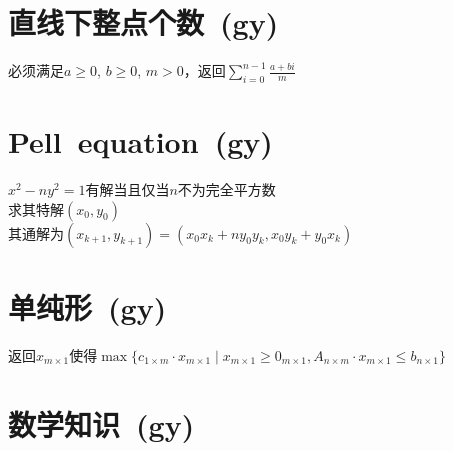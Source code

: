 \section{直线下整点个数\ \small(gy)}
    必须满足$ a \geq 0 $, $ b \geq 0 $, $ m > 0 $，返回$ \sum\limits_{i=0}^{n-1} \frac{a + bi}{m} $

\section{Pell\ equation\ \small(gy)}
    $ x^2 - n y^2 = 1 $有解当且仅当$ n $不为完全平方数
    \\求其特解$ (x_0, y_0) $
    \\其通解为$ (x_{k + 1}, y_{k + 1}) = (x_0 x_k + n y_0 y_k, x_0 y_k + y_0 x_k ) $

\section{单纯形\ \small(gy)}
    返回$ x_{m \times 1} $使得$ \max \lbrace c_{1 \times m} \cdot x_{m \times 1} \mid x_{m \times 1} \geq 0_{m \times 1}, A_{n \times m} \cdot x_{m \times 1} \leq b_{n \times 1} \rbrace $

\section{数学知识\ \small(gy)}
    

